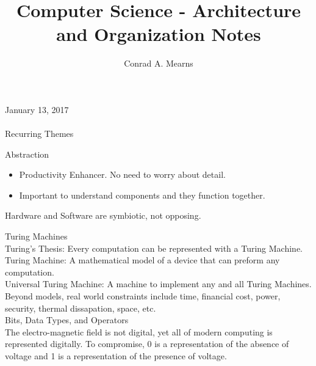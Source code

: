 \documentclass{article}
\title{Computer Science - Architecture and Organization Notes}
\author{Conrad A. Mearns}
\begin{document}
\maketitle

\noindent
\Large January 13, 2017\\\\
Recurring Themes
\normalsize
\noindent

Abstraction
\begin{itemize}
  \item Productivity Enhancer. No need to worry about detail.
  \item Important to understand components and they function together.
\end{itemize}

Hardware and Software are symbiotic, not opposing.

\noindent
\Large Turing Machines\\
\normalsize
\noindent
Turing's Thesis: Every computation can be represented with a Turing Machine.\\
Turing Machine: A mathematical model of a device that can preform any computation.\\
Universal Turing Machine: A machine to implement any and all Turing Machines.\\

Beyond models, real world constraints include time, financial cost, power, security, thermal dissapation, space, etc.\\

\noindent
\Large Bits, Data Types, and Operators\\
\normalsize
\noindent
The electro-magnetic field is not digital, yet all of modern computing is represented digitally. To compromise, 0 is a representation of the absence of voltage and 1 is a representation of the presence of voltage.

\centering
{}
\raggedright
\end{document}
